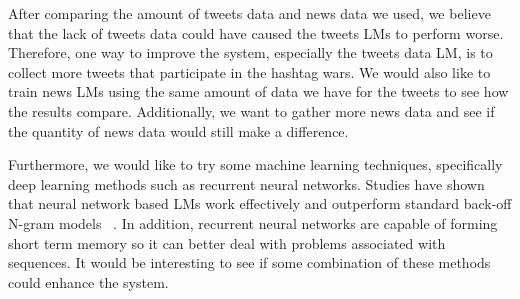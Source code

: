 \documentclass[11pt,a4paper]{article}
\begin{document}
After comparing the amount of tweets data and news data we used, we believe that the lack of tweets data could have caused the tweets LMs to perform worse. Therefore, one way to improve the system, especially the tweets data LM, is to collect more tweets that participate in the hashtag wars. We would also like to train news LMs using the same amount of data we have for the tweets to see how the results compare. Additionally, we want to gather more news data and see if the quantity of news data would still make a difference. 

Furthermore, we would like to try some machine learning techniques, specifically deep learning methods such as recurrent neural networks. Studies have shown that neural network based LMs work effectively and outperform standard back-off N-gram models ~\cite{mikolov2011extensions}. In addition, recurrent neural networks are capable of forming short term memory so it can better deal with problems associated with sequences. It would be interesting to see if some combination of these methods could enhance the system.




%
%


\end{document}
